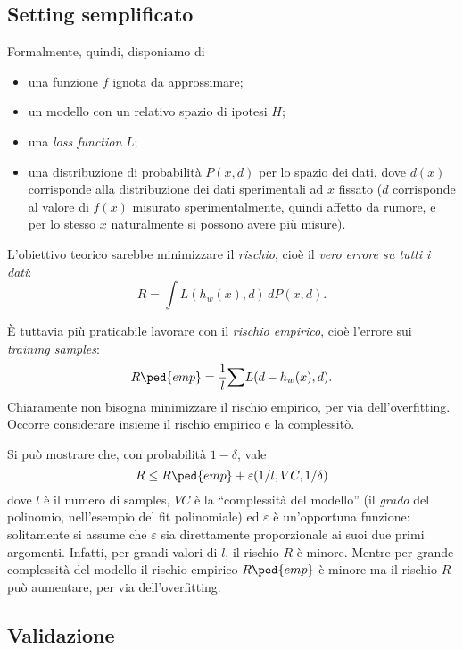 \subsection{Setting semplificato}

Formalmente, quindi, disponiamo di
\begin{itemize}
\item una funzione $f$ ignota da approssimare;
\item un modello con un relativo spazio di ipotesi $H$;
\item una \emph{loss function} $L$;
\item una distribuzione di probabilità $P(x,d)$ per lo spazio dei dati, dove $d(x)$ corrisponde alla distribuzione dei dati sperimentali ad $x$ fissato ($d$ corrisponde al valore di $f(x)$ misurato sperimentalmente, quindi affetto da rumore, e per lo stesso $x$ naturalmente si possono avere più misure).
\end{itemize}
L'obiettivo teorico sarebbe minimizzare il \emph{rischio}, cioè il \emph{vero errore su tutti i dati}:
\begin{equation}
R=\int L(h_w(x),d)\,dP(x,d).
\end{equation}

È tuttavia più praticabile lavorare con il \emph{rischio empirico}, cioè l'errore sui \emph{training samples}:
\begin{equation}
R\ped{emp}=\frac{1}{l}\sum L(d-h_w(x),d).
\end{equation}
Chiaramente non bisogna minimizzare il rischio empirico, per via dell'overfitting. Occorre considerare insieme il rischio empirico e la complessitò.

Si può mostrare che, con probabilità $1-\delta$, vale
\begin{equation}
R\le R\ped{emp} + \varepsilon(1/l, VC, 1/\delta)
\end{equation}
dove $l$ è il numero di samples, $VC$ è la “complessità del modello” (il \emph{grado} del polinomio, nell'esempio del fit polinomiale) ed $\varepsilon$ è un'opportuna funzione: solitamente si assume che $\varepsilon$ sia direttamente proporzionale ai suoi due primi argomenti. Infatti, per grandi valori di $l$, il rischio $R$ è minore. Mentre per grande complessità del modello il rischio empirico $R\ped{emp}$ è minore ma il rischio $R$ può aumentare, per via dell'overfitting.

\subsection{Validazione}

